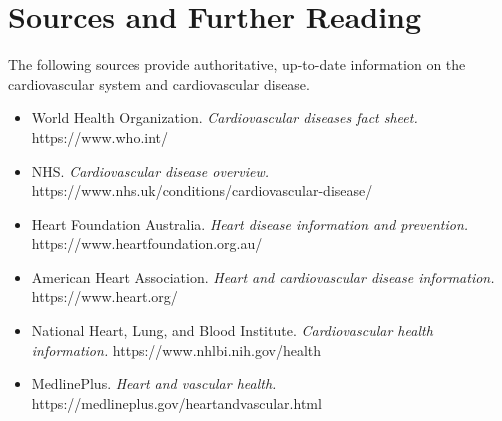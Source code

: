 \section*{Sources and Further Reading}
The following sources provide authoritative, up-to-date information on the cardiovascular system and cardiovascular disease.
\begin{itemize}
    \item World Health Organization. \textit{Cardiovascular diseases fact sheet.} https://www.who.int/
    \item NHS. \textit{Cardiovascular disease overview.} https://www.nhs.uk/conditions/cardiovascular-disease/
    \item Heart Foundation Australia. \textit{Heart disease information and prevention.} https://www.heartfoundation.org.au/
    \item American Heart Association. \textit{Heart and cardiovascular disease information.} https://www.heart.org/
    \item National Heart, Lung, and Blood Institute. \textit{Cardiovascular health information.} https://www.nhlbi.nih.gov/health
    \item MedlinePlus. \textit{Heart and vascular health.} https://medlineplus.gov/heartandvascular.html
\end{itemize}
